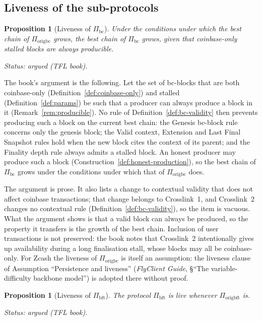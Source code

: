 \documentclass[11pt,a4paper]{article}
\newtheorem{proposition}[theorem]{Proposition}
\theoremstyle{definition}
\newcommand{\bc}{\mathrm{bc}}
\newcommand{\bft}{\mathrm{bft}}
\newcommand{\Piorigbc}{\Pi_{\mathrm{origbc}}}
\newcommand{\Piorigbft}{\Pi_{\mathrm{origbft}}}
\newcommand{\Pibc}{\Pi_{\bc}}
\newcommand{\Pibft}{\Pi_{\bft}}
\begin{document}
\subsection{Liveness of the sub-protocols}\label{sec:live-sub}

\begin{proposition}[Liveness of $\Pibc$]\label{prop:bc-live}
Under the conditions under which the best chain of $\Piorigbc$ grows, the
best chain of $\Pibc$ grows, given that coinbase-only stalled blocks are
always producible.

Status: argued (TFL book).
\end{proposition}

The book's argument is the following. Let the set of bc-blocks that are
both coinbase-only (Definition~\ref{def:coinbase-only}) and stalled
(Definition~\ref{def:params}) be such that a producer can always produce a
block in it (Remark~\ref{rem:producible}). No rule of
Definition~\ref{def:bc-validity} then prevents producing such a block on the
current best chain: the Genesis bc-block rule concerns only the genesis
block; the Valid context, Extension and Last Final Snapshot rules hold when
the new block cites the context of its parent; and the Finality depth rule
always admits a stalled block. An honest producer may produce such a block
(Construction~\ref{def:honest-production}), so the best chain of $\Pibc$
grows under the conditions under which that of $\Piorigbc$ does.

The argument is prose. It also lists a change to contextual validity that
does not affect coinbase transactions; that change belongs to Crosslink~1,
and Crosslink~2 changes no contextual rule (Definition~\ref{def:bc-validity}),
so the item is vacuous. What the argument shows is that a valid block can
always be produced, so the property it transfers is the growth of the best
chain. Inclusion of user transactions is not preserved: the book notes that
Crosslink~2 intentionally gives up availability during a long finalisation
stall, whose blocks may all be coinbase-only. For Zcash the liveness of
$\Piorigbc$ is itself an assumption: the liveness clause of Assumption
``Persistence and liveness'' (\emph{FlyClient Guide}, \S``The
variable-difficulty backbone model'') is adopted there without proof.

\begin{proposition}[Liveness of $\Pibft$]\label{prop:bft-live}
The protocol $\Pibft$ is live whenever $\Piorigbft$ is.

Status: argued (TFL book).
\end{proposition}
\end{document}
